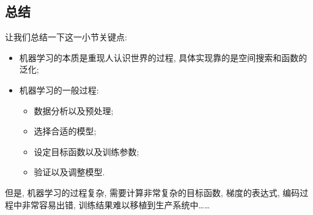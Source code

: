 \subsection{总结}
\begin{frame}{\insertsection}{\insertsubsection}
让我们总结一下这一小节关键点:%
%
\begin{itemize}
\item 机器学习的本质是重现人认识世界的过程, 具体实现靠的是空间搜索和函数的泛化;
\item 机器学习的一般过程:
\begin{itemize}
\item 数据分析以及预处理;
\item 选择合适的模型;
\item 设定目标函数以及训练参数;
\item 验证以及调整模型.
\end{itemize}
\end{itemize}

但是, 机器学习的过程复杂, 需要计算非常复杂的目标函数, 梯度的表达式, 编码过程中非常容易出错, 训练结果难以移植到生产系统中……
\end{frame}







